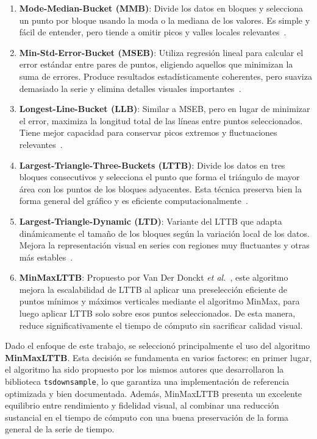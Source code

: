 \begin{enumerate}
    \item \textbf{Mode-Median-Bucket (MMB)}: 
    Divide los datos en bloques y selecciona un punto por bloque usando la moda o la mediana de los valores. Es simple y fácil de entender, pero tiende a omitir picos y valles locales relevantes~\cite{steinarsson2013downsampling}.

    \item \textbf{Min-Std-Error-Bucket (MSEB)}: 
    Utiliza regresión lineal para calcular el error estándar entre pares de puntos, eligiendo aquellos que minimizan la suma de errores. Produce resultados estadísticamente coherentes, pero suaviza demasiado la serie y elimina detalles visuales importantes~\cite{steinarsson2013downsampling}.

    \item \textbf{Longest-Line-Bucket (LLB)}: 
    Similar a MSEB, pero en lugar de minimizar el error, maximiza la longitud total de las líneas entre puntos seleccionados. Tiene mejor capacidad para conservar picos extremos y fluctuaciones relevantes~\cite{steinarsson2013downsampling}.

    \item \textbf{Largest-Triangle-Three-Buckets (LTTB)}: 
    Divide los datos en tres bloques consecutivos y selecciona el punto que forma el triángulo de mayor área con los puntos de los bloques adyacentes. Esta técnica preserva bien la forma general del gráfico y es eficiente computacionalmente~\cite{steinarsson2013downsampling}.

    \item \textbf{Largest-Triangle-Dynamic (LTD)}: 
    Variante del LTTB que adapta dinámicamente el tamaño de los bloques según la variación local de los datos. Mejora la representación visual en series con regiones muy fluctuantes y otras más estables~\cite{steinarsson2013downsampling}.

    \item \textbf{MinMaxLTTB}: 
    Propuesto por Van Der Donckt {\it et al.}~\cite{vanderdonckt2023minmaxlttb}, este algoritmo mejora la escalabilidad de LTTB al aplicar una preselección eficiente de puntos mínimos y máximos verticales mediante el algoritmo MinMax, para luego aplicar LTTB solo sobre esos puntos seleccionados. De esta manera, reduce significativamente el tiempo de cómputo sin sacrificar calidad visual.
\end{enumerate}

Dado el enfoque de este trabajo, se seleccionó principalmente el uso del algoritmo \textbf{MinMaxLTTB}. Esta decisión se fundamenta en varios factores: en primer lugar, el algoritmo ha sido propuesto por los mismos autores que desarrollaron la biblioteca \texttt{tsdownsample}, lo que garantiza una implementación de referencia optimizada y bien documentada. Además, MinMaxLTTB presenta un excelente equilibrio entre rendimiento y fidelidad visual, al combinar una reducción sustancial en el tiempo de cómputo con una buena preservación de la forma general de la serie de tiempo.

